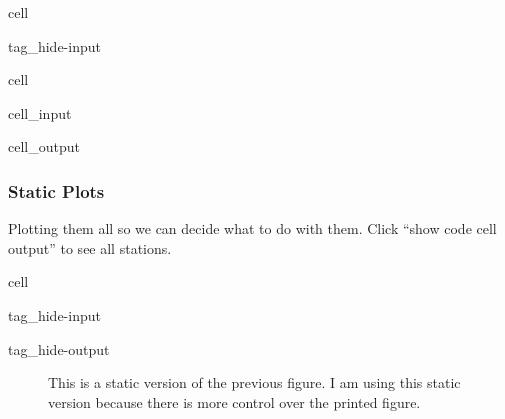 \documentclass[letterpaper,10pt,english]{jupyterBook}
\begin{document}
\begin{sphinxuseclass}{cell}
\begin{sphinxuseclass}{tag_hide-input}
\end{sphinxuseclass}
\end{sphinxuseclass}
\begin{sphinxuseclass}{cell}\begin{sphinxVerbatimInput}

\begin{sphinxuseclass}{cell_input}
\begin{sphinxVerbatim}[commandchars=\\\{\}]
          
         
\end{sphinxVerbatim}

\end{sphinxuseclass}\end{sphinxVerbatimInput}
\begin{sphinxVerbatimOutput}

\begin{sphinxuseclass}{cell_output}
\end{sphinxuseclass}\end{sphinxVerbatimOutput}

\end{sphinxuseclass}

\subsubsection{Static Plots}
\label{\detokenize{notebooks/regional_and_local/SL_Rankings_annual:static-plots}}
\sphinxAtStartPar
Plotting them all so we can decide what to do with them. Click “show code cell output” to see all stations.

\begin{sphinxuseclass}{cell}
\begin{sphinxuseclass}{tag_hide-input}
\begin{sphinxuseclass}{tag_hide-output}
\end{sphinxuseclass}
\end{sphinxuseclass}
\end{sphinxuseclass}
\begin{figure}[htbp]
\centering
\capstart

\noindent{}
\caption{This is a static version of the previous figure. I am using this static version because there is more control over the printed figure.}\label{\detokenize{notebooks/regional_and_local/SL_Rankings_annual:sl-rankings}}\end{figure}
\end{document}
